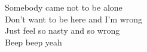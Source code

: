 Somebody came not to be alone \\
Don't want to be here and I'm wrong \\
Just feel so nasty and so wrong \\
Beep beep yeah
